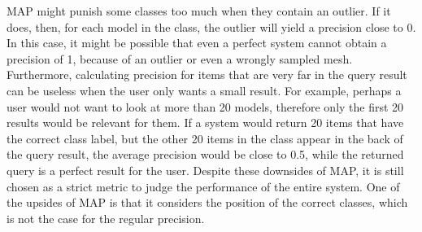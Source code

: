 \documentclass{bigdata}
\begin{document}
MAP  might punish some classes too much when they contain an outlier. If it does, then, for each model in the class, the outlier will yield a precision close to 0. In this case, it might be possible that even a perfect system cannot obtain a precision of 1, because of an outlier or even a wrongly sampled mesh. Furthermore, calculating precision for items that are very far in the query result can be useless when the user only wants a small result. For example, perhaps a user would not want to look at more than 20 models, therefore only the first 20 results would be relevant for them. If a system would return 20 items that have the correct class label, but the other 20 items in the class appear in the back of the query result, the average precision would be close to 0.5, while the returned query is a perfect result for the user. Despite these downsides of MAP, it is still chosen as a strict metric to judge the performance of the entire system. One of the upsides of MAP is that it considers the position of the correct classes, which is not the case for the regular precision. 
\end{document}
